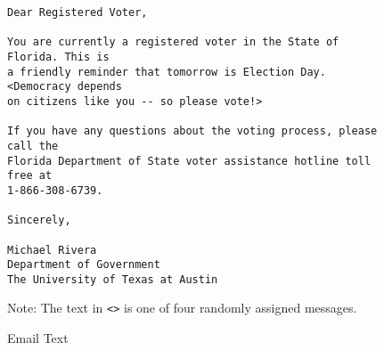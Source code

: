 \begin{figure}[h]
  \caption{Email Text   \label{fig:stimulus}}

  
\begin{verbatim}
Dear Registered Voter,

You are currently a registered voter in the State of Florida. This is
a friendly reminder that tomorrow is Election Day. <Democracy depends
on citizens like you -- so please vote!> 
    
If you have any questions about the voting process, please call the
Florida Department of State voter assistance hotline toll free at
1-866-308-6739. 

Sincerely, 

Michael Rivera
Department of Government
The University of Texas at Austin
\end{verbatim}
  {\footnotesize Note: The text in \texttt{<>} is one of four randomly
    assigned messages.}
\end{figure}
